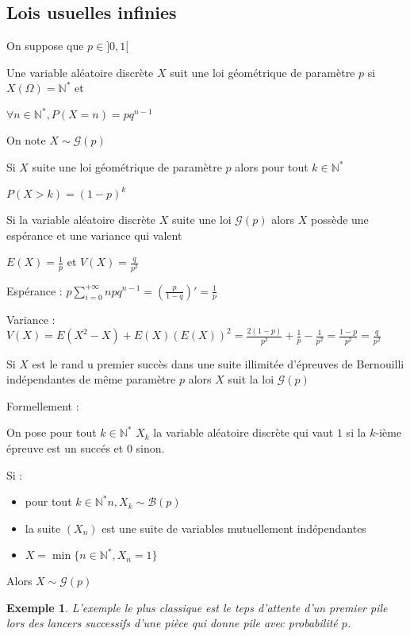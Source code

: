 \documentclass[a4paper,12pt]{book}
\newcommand{\Def}[2]{\begin{tcolorbox}[sharp corners, colback=white,colframe=blue!90!black!75, title=Définition : #1]#2\end{tcolorbox}}
\newcommand{\Prop}[2]{\begin{tcolorbox}[sharp corners, colback=white,colframe=red!90!black!75, title=Proposition : #1]#2\end{tcolorbox}}
\newcommand{\Pre}[1]{\begin{tcolorbox}[sharp corners, colback=white,colframe=green!60!green!30!black!75, title=Preuve]#1\end{tcolorbox}}
\newtheorem{Exe}{Exemple}[section]
\def\N{\mathbb{N}}
\begin{document}
\subsection{Lois usuelles infinies}
\Def{}{On suppose que $p\in]0,1[$
\par Une variable aléatoire discrète $X$ suit une loi géométrique de paramètre $p$ si $X(\Omega)=\N^*$ et
\par\begin{center}$\forall n\in\N^*, P(X=n)=pq^{n-1}$\end{center}
\par On note $X\sim\mathcal{G}(p)$}
\Prop{}{Si $X$ suite une loi géométrique de paramètre $p$ alors pour tout $k\in\N^*$
\par\begin{center}$P(X>k)=(1-p)^k$\end{center}}
\Prop{Espérance et variance d'une loi géométrique}{Si la variable aléatoire discrète $X$ suite une loi $\mathcal{G}(p)$ alors $X$ possède une espérance et une variance qui valent
\par\begin{center}$E(X)=\frac{1}{p}$ et $V(X)=\frac{q}{p^2}$\end{center}}
\Pre{Espérance : $p\sum\limits_{i=0}^{+\infty} npq^{n-1} = \left(\frac{p}{1-q}\right)'=\frac{1}{p}$
\par Variance : $ V(X) = E(X^2 - X)+E(X) (E(X))^2 = \frac{2(1-p)}{p^2}+\frac{1}{p} -\frac{1}{p^2} = \frac{1-p}{p^2} = \frac{q}{p^2}$}
\Prop{Modèle loi géométrique}{Si $X$ est le rand u premier succès dans une suite illimitée d'épreuves de Bernouilli indépendantes de même paramètre $p$ alors $X$ suit la loi $\mathcal{G}(p)$
\par Formellement :
\par On pose pour tout $k\in\N^*$ $X_k$ la variable aléatoire discrète qui vaut $1$ si la $k$-ième épreuve est un succés et $0$ sinon.
\par Si :\begin{itemize}
\item pour tout $k\in\N^*n, X_k\sim\mathcal{B}(p)$
\item la suite $(X_n)$ est une suite de variables mutuellement indépendantes
\item $X = \min\{n\in\N^*, X_n=1\}$
\end{itemize}
Alors $X\sim\mathcal{G}(p)$}
\begin{Exe}
L'exemple le plus classique est le teps d'attente d'un premier pile lors des lancers successifs d'une pièce qui donne pile avec probabilité $p$.
\end{Exe}
\end{document}
